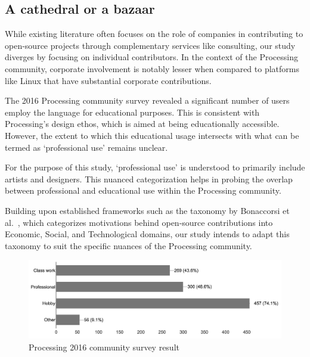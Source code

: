 \subsection{A cathedral or a bazaar}

While existing literature often focuses on the role of companies in contributing to open-source projects through complementary services like consulting, our study diverges by focusing on individual contributors. In the context of the Processing community, corporate involvement is notably lesser when compared to platforms like Linux that have substantial corporate contributions.

The 2016 Processing community survey revealed a significant number of users employ the language for educational purposes. This is consistent with Processing's design ethos, which is aimed at being educationally accessible. However, the extent to which this educational usage intersects with what can be termed as `professional use' remains unclear.

For the purpose of this study, `professional use' is understood to primarily include artists and designers. This nuanced categorization helps in probing the overlap between professional and educational use within the Processing community.

Building upon established frameworks such as the taxonomy by Bonaccorsi et al.~\cite{bonaccorsiComparingMotivationsIndividual2006}, which categorizes motivations behind open-source contributions into Economic, Social, and Technological domains, our study intends to adapt this taxonomy to suit the specific nuances of the Processing community.

\begin{figure}[h!]
	\centering
	\includegraphics[width=\textwidth]{images/community-survey.png}
	\caption{Processing 2016 community survey result \parencite{2016CommunitySurvey}}
	\label{fig:community_survey}
\end{figure}




